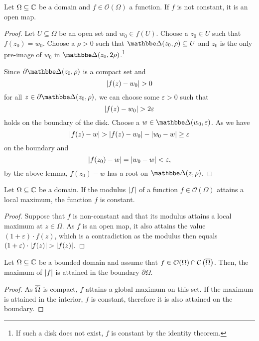 \begin{izrek}
Let $\Omega \subseteq \mathbb{C}$ be a domain and
$f \in \mathcal{O}(\Omega)$ a function. If $f$ is not constant, it
is an open map.
\end{izrek}

\begin{proof}Let $U \subseteq \Omega$ be an open set and $w_0 \in f(U)$. Choose
a $z_0 \in U$ such that $f(z_0) = w_0$. Choose a $\rho > 0$ such
that $\dsk(z_0, \rho) \subseteq U$ and $z_0$ is the only pre-image
of $w_0$ in $\dsk(z_0, 2\rho)$.\footnote{If such a disk does not
exist, $f$ is constant by the identity theorem.}

Since $\partial \dsk(z_0, \rho)$ is a compact set and
\[
\left\lvert f(z) - w_0\right\rvert > 0
\]
for all $z \in \partial \dsk(z_0, \rho)$, we can choose some
$\varepsilon > 0$ such that
\[
\left\lvert f(z) - w_0\right\rvert > 2 \varepsilon
\]
holds on the boundary of the disk. Choose a
$w \in \dsk(w_0, \varepsilon)$. As we have
\[
\left\lvert f(z) - w\right\rvert >
\left\lvert f(z) - w_0\right\rvert - \left\lvert w_0 - w\right\rvert \geq
\varepsilon
\]
on the boundary and
\[
\left\lvert f(z_0) - w\right\rvert = \left\lvert w_0 - w\right\rvert < \varepsilon,
\]
by the above lemma, $f(z_0) - w$ has a root on $\dsk(z, \rho)$.
\end{proof}

\begin{izrek}
Let $\Omega \subseteq \mathbb{C}$ be a domain. If the modulus $\left\lvert f\right\rvert$ of
a function $f \in \mathcal{O}(\Omega)$ attains a local maximum, the
function $f$ is constant.
\end{izrek}

\begin{proof}
Suppose that $f$ is non-constant and that its modulus attains a
local maximum at $z \in \Omega$. As $f$ is an open map, it also
attains the value $(1 + \varepsilon) \cdot f(z)$, which is a
contradiction as the modulus then equals
$(1 + \varepsilon) \cdot \left\lvert f(z)\right\rvert > \left\lvert f(z)\right\rvert$.
\end{proof}

\begin{izrek}
Let $\Omega \subseteq \mathbb{C}$ be a bounded domain and assume that
$f \in \mathcal{O}(\Omega) \cap \mathcal{C} \left(\overline{\Omega}\right)$.
Then, the maximum of $\left\lvert f\right\rvert$ is attained in the boundary
$\partial \Omega$.
\end{izrek}

\begin{proof}
As $\overline{\Omega}$ is compact, $f$ attains a global maximum on
this set. If the maximum is attained in the interior, $f$ is
constant, therefore it is also attained on the boundary.
\end{proof}

